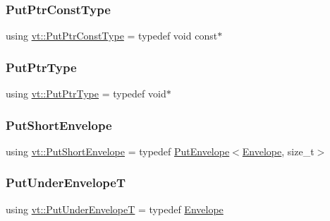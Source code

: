 \subsubsection{\texorpdfstring{Put\+Ptr\+Const\+Type}{PutPtrConstType}}
{\footnotesize\ttfamily using \hyperlink{namespacevt_a494d6c6dc5cdb9a8d61eaedfa2c4d4f3}{vt\+::\+Put\+Ptr\+Const\+Type} = typedef void const$\ast$}

\mbox{\label{namespacevt_a537693bfe0223c71eb52bdbd6ea2c741}} 
\subsubsection{\texorpdfstring{Put\+Ptr\+Type}{PutPtrType}}
{\footnotesize\ttfamily using \hyperlink{namespacevt_a537693bfe0223c71eb52bdbd6ea2c741}{vt\+::\+Put\+Ptr\+Type} = typedef void$\ast$}

\mbox{\label{namespacevt_a8d7a7de9e76bfea1600009a775b7298c}} 
\subsubsection{\texorpdfstring{Put\+Short\+Envelope}{PutShortEnvelope}}
{\footnotesize\ttfamily using \hyperlink{namespacevt_a8d7a7de9e76bfea1600009a775b7298c}{vt\+::\+Put\+Short\+Envelope} = typedef \hyperlink{structvt_1_1_put_envelope}{Put\+Envelope}$<$\hyperlink{namespacevt_aa9c8cc094b5361482021d63012987814}{Envelope}, size\+\_\+t$>$}

\mbox{\label{namespacevt_a233c004b26ccd826ef10686169371e01}} 
\subsubsection{\texorpdfstring{Put\+Under\+EnvelopeT}{PutUnderEnvelopeT}}
{\footnotesize\ttfamily using \hyperlink{namespacevt_a233c004b26ccd826ef10686169371e01}{vt\+::\+Put\+Under\+EnvelopeT} = typedef \hyperlink{namespacevt_aa9c8cc094b5361482021d63012987814}{Envelope}}

\mbox{\label{namespacevt_ae54d2ca8f6bb4d65faf65118c82cd6f7}} 
